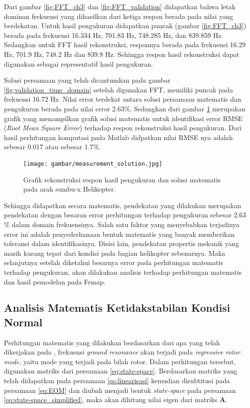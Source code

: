 Dari gambar \ref{fig:FFT_ch3} dan \ref{fig:FFT_validation} didapatkan bahwa letak dominan frekuensi yang dihasilkan dari ketiga respon berada pada nilai yang berdekatan. Untuk hasil pengukuran didapatkan puncak (gambar \ref{fig:FFT_ch3}) berada pada frekuensi 16.334 Hz, 701.83 Hz, 748.285 Hz, dan 839.859 Hz. Sedangkan untuk FFT hasil rekonstruksi, responnya berada pada frekuensi 16.29 Hz, 701.9 Hz, 748.2 Hz dan 839.8 Hz. Sehingga respon hasil rekonstruksi dapat digunakan sebagai representatif hasil pengukuran.

Solusi persamaan yang telah dicantumkan pada gambar \ref{fig:validation_time_domain} setelah digunakan FFT, memiliki puncak pada frekuensi 16.72 Hz. Nilai error terdekat antara solusi persamaan matematis dan pengukuran berada pada nilai error 2.63$\%$. Sedangkan dari gambar \ref{fig:measur_solution} merupakan grafik yang menampilkan grafik solusi matematis untuk identifikasi error RMSE (\textit{Root Mean Square Error}) terhadap respon rekonstruksi hasil pengukuran. Dari hasil perhitungan komputasi pada Matlab didpatkan nilai RMSE nya adalah sebesar 0.017 atau sebesar 1.7$\%$.

\begin{figure}[H]
	\centering
	\texttt{[image: gambar/measurement\_solution.jpg]}
	\caption{Grafik rekonstruksi respon hasil pengukuran dan solusi matematis pada arah sumbu-x Helikopter.}
	\label{fig:measur_solution}
\end{figure}

Sehingga didapatkan secara matematis, pendekatan yang dilakukan merupakan pendekatan dengan besaran error perhitungan terhadap pengukuran sebesar 2.63$\%$ dalam domain frekuensinya. Salah satu faktor yang menyebabkan terjadinya error ini adalah penyederhanaan bentuk matematis yang banyak memberikan toleransi dalam identifikasinya. Disisi lain, pendekatan propertis mekanik yang masih kurang tepat dari kondisi pada bagian helikopter sebenarnya. Maka selanjutnya setelah diketahui besarnya error pada perhitungan matematis terhadap pengukuran, akan dilakukan analisis terhadap perhitungan matematis dan hasil pemodelan pada Femap.

\subsection{Analisis Matematis Ketidakstabilan Kondisi Normal}

Perhitungan matematis yang dilakukan berdasarkan dari apa yang telah dikerjakan pada \cite{BERGEOT201672}, frekuensi \textit{ground resonance} akan terjadi pada \textit{regressive rotor mode}, yaitu mode yang terjadi pada bilah rotor. Dalam perhitungan tersebut, digunakan matriks dari persamaan \ref{eq:state-space}. Berdasarkan matriks yang telah didapatkan pada persamaan \ref{eq:linearisasi} kemudian disubtitusi pada persamaan \ref{eq:EOM} dan diubah menjadi bentuk \textit{state-space} pada persamaan \ref{eq:state-space_simplified}, maka akan dihitung nilai eigen dari matriks \textbf{A}.

